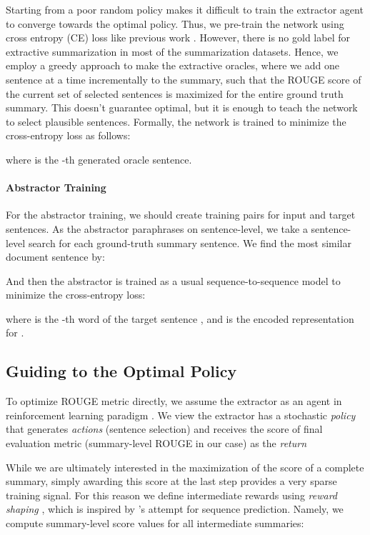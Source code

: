 \documentclass[11pt,a4paper]{article}
\begin{document}
Starting from a poor random policy makes it difficult to
train the extractor agent to converge towards the optimal policy.
Thus, we pre-train the network using cross entropy (CE) loss
like previous work \cite{DBLP:conf/iclr/BahdanauBXGLPCB17, chen-bansal-2018-fast}.
However, there is no gold label for extractive summarization
in most of the summarization datasets.
Hence, we employ a greedy approach \cite{nallapati2017summarunner}
to make the extractive oracles,
where we add one sentence at a time incrementally to the summary,
such that the ROUGE score of the current set of selected sentences
is maximized for the entire ground truth summary.
This doesn't guarantee optimal, but it is enough
to teach the network to select plausible sentences.
Formally, the network is trained to minimize
the cross-entropy loss as follows:

where  is the -th generated oracle sentence.

\paragraph{Abstractor Training}

For the abstractor training, we should create
training pairs for input and target sentences.
As the abstractor paraphrases on sentence-level,
we take a sentence-level search for each ground-truth
summary sentence. We find the most similar document
sentence  by:

And then the abstractor is trained as a usual sequence-to-sequence
model to minimize  the cross-entropy loss:

where  is the -th word of the target sentence ,
and  is the encoded representation for .

\subsection{Guiding to the Optimal Policy}

To optimize ROUGE metric directly, we assume the extractor
as an agent in reinforcement learning paradigm \cite{sutton1998introduction}.
We view the extractor has a stochastic \emph{policy} that generates
\emph{actions} (sentence selection) and receives the score of final evaluation metric
(summary-level ROUGE in our case) as the \emph{return}


While we are ultimately interested in the maximization of the
score of a complete summary, simply awarding this score at the
last step provides a very sparse training signal.
For this reason we define intermediate rewards using
\emph{reward shaping} \cite{Ng:1999:PIU:645528.657613},
which is inspired by \citet{DBLP:conf/iclr/BahdanauBXGLPCB17}'s attempt for sequence prediction.
Namely, we compute summary-level score values for all intermediate
summaries:
\end{document}
